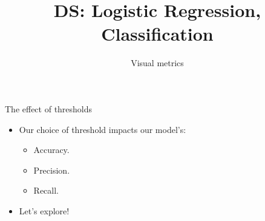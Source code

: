 \documentclass[aspectratio=169]{../latex_main/tntbeamer}  %
\title[Introduction]{DS: Logistic Regression, Classification}
\subtitle{Visual metrics}
\begin{document}
	
	\maketitle
	\begin{frame}{The effect of thresholds}
	    \begin{itemize}
	        \item Our choice of threshold impacts our model’s:
	        \begin{itemize}
	            \item Accuracy.
	            \item Precision.
	            \item Recall.
	        \end{itemize}
	        \item Let’s explore!
	    \end{itemize}
	\end{frame}
	
\end{document}
